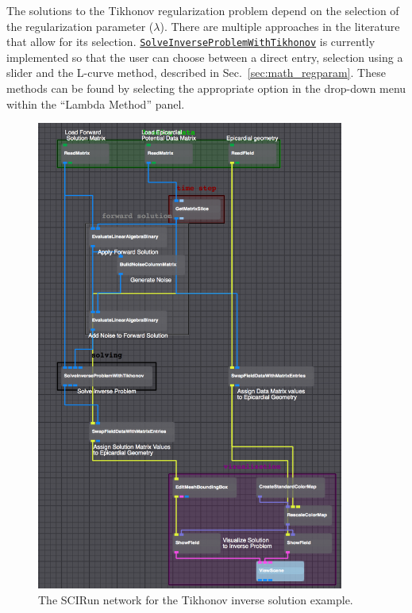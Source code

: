 
    The solutions to the Tikhonov regularization problem depend on the selection of the regularization parameter ($\lambda$).
    There are multiple approaches in the literature that allow for its selection.
    \href{http://scirundocwiki.sci.utah.edu/SCIRunDocs/index.php/CIBC:Documentation:SCIRun:Reference:BioPSE:SolveInverseProblemWithTikhonov}{{\tt SolveInverseProblemWithTikhonov}} is currently implemented so that the user can choose between a direct entry, selection using a slider and the L-curve method, described in Sec.~\ref{sec:math_regparam}.
    These methods can be found by selecting the appropriate option in the drop-down menu within the ``Lambda Method'' panel.


    \begin{figure}
        \begin{center}
        \includegraphics[width=0.9\textwidth]{ECGToolkitGuide_figures/TikhonovNetwork.png}
        \caption{The SCIRun network for the Tikhonov inverse solution example.}
        \label{TikhonovNetworkExample}
        \end{center}
    \end{figure}




